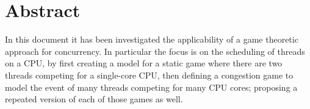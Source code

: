 \section*{Abstract}

In this document it has been investigated the applicability of a game theoretic approach for concurrency.
In particular the focus is on the scheduling of threads on a CPU, by first creating a model for a static
game where there are two threads competing for a single-core CPU, then defining a congestion game to
model the event of many threads competing for many CPU cores; proposing a repeated version of each of those games as well.